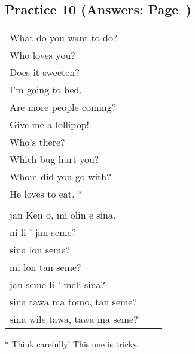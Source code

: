 \subsection*{Practice 10 (Answers: Page~\pageref{'questions_using_seme'})}
%
\begin{supertabular}{p{5,5cm}|ll}
What do you want to do? &&   \\ %
Who loves you? &&   \\ %
Does it sweeten?  &&  \\ %
I'm going to bed. && \\  %
Are more people coming? &&  \\  %
Give me a lollipop! && \\   %
Who's there? &&   \\ %
Which bug hurt you?  &&  \\ %
Whom did you go with? &&  \\  %
He loves to eat. * &&  \\ %
 && \\ %
jan Ken o, mi olin e sina.  && \\  %
ni li ' jan seme?  && \\  %
sina lon seme?   && \\  %
mi lon tan seme?  && \\  %
jan seme li ' meli sina?   && \\    %
sina tawa ma tomo, tan seme?    && \\   %
sina wile tawa, tawa  ma seme?      && \\  %
\end{supertabular} 

* Think carefully! This one is tricky. 
